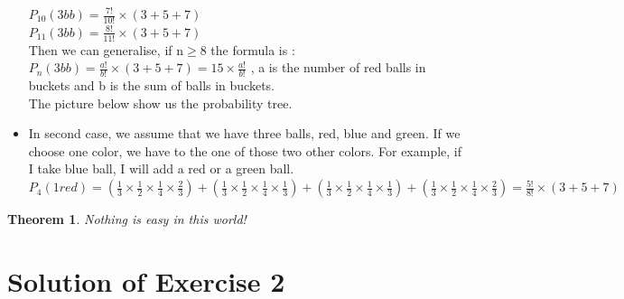 \documentclass[12pt,a4paper]{article}
\newtheorem{theo}{Theorem}
\begin{document}
\begin{itemize}
$P_{10}(3bb) = \frac{7!}{10!}\times (3 + 5 + 7)$ \\

$P_{11}(3bb) = \frac{8!}{11!}\times (3 + 5 + 7)$ \\

Then we can generalise, if n$ \geq8$ the formula is : \\
$P_n(3bb) = \frac{a!}{b!}\times(3 + 5 + 7) = 15\times \frac{a!}{b!}$ , a is the number of red balls in buckets and b is the sum of balls in buckets. \\

The picture below show us the probability tree.


\item In second case, we assume that we have three balls, red, blue and green.
If we choose one color, we have to the one of those two other colors. For example, if I take blue ball, I will add a red or a green ball. \\

$P_4(1red) = (\frac{1}{3} \times \frac{1}{2} \times \frac{1}{4} \times \frac{2}{3}) + (\frac{1}{3}  \times \frac{1}{2} \times \frac{1}{4} \times \frac{1}{3} ) + (\frac{1}{3}  \times \frac{1}{2} \times \frac{1}{4} \times \frac{1}{3}) + (\frac{1}{3}  \times \frac{1}{2} \times \frac{1}{4} \times \frac{2}{3}) = \frac{5!}{8!}\times(3 + 5 + 7)$ \\
\end{itemize}

\begin{theo}
	Nothing is easy in this world!
\end{theo}

\section{Solution of Exercise 2}

















%
\end{document}
